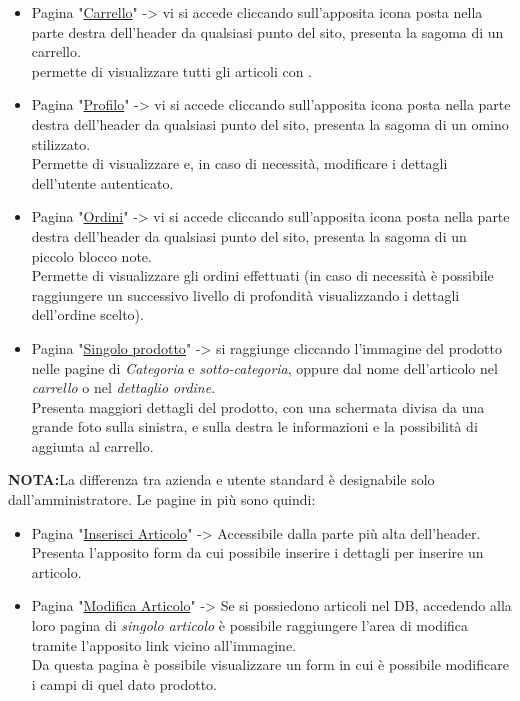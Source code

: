 \begin{itemize}
	\item Pagina "\underline{Carrello}" -> vi si accede cliccando sull’apposita icona posta nella parte destra dell'header da qualsiasi punto del sito, presenta la sagoma di un carrello.\\
	permette di visualizzare tutti gli articoli con .
	\item Pagina "\underline{Profilo}" ->  vi si accede cliccando sull’apposita icona posta nella parte destra dell'header da qualsiasi punto del sito, presenta la sagoma di un omino stilizzato.\\ Permette di visualizzare e, in caso di necessità, modificare i dettagli dell’utente autenticato.
	\item Pagina "\underline{Ordini}" ->  vi si accede cliccando sull’apposita icona posta nella parte destra dell'header da qualsiasi punto del sito, presenta la sagoma di un piccolo blocco note.\\ Permette di visualizzare gli ordini effettuati (in caso di necessità è possibile raggiungere un successivo livello di profondità visualizzando i dettagli dell'ordine scelto).
	\item Pagina "\underline{Singolo prodotto}" -> si raggiunge cliccando l'immagine del prodotto nelle pagine di \textit{Categoria} e \textit{sotto-categoria}, oppure dal nome dell'articolo nel \textit{carrello} o nel \textit{dettaglio ordine}.\\
	Presenta maggiori dettagli del prodotto, con una schermata divisa da una grande foto sulla sinistra, e sulla destra le informazioni e la possibilità di aggiunta al carrello.
\end{itemize}


\textbf{NOTA:}La differenza tra azienda e utente standard è designabile solo dall'amministratore.
Le pagine in più sono quindi:
\begin{itemize}
	\item Pagina "\underline{Inserisci Articolo}" -> Accessibile dalla parte più alta dell'header.\\ Presenta l'apposito form da cui possibile inserire i dettagli per inserire un articolo.
	\item Pagina "\underline{Modifica Articolo}" -> Se si possiedono articoli nel DB, accedendo alla loro pagina di \textit{singolo articolo} è possibile raggiungere l'area di modifica tramite l'apposito link vicino all'immagine.\\
	Da questa pagina è possibile visualizzare un form in cui è possibile modificare i campi di quel dato prodotto.
\end{itemize}


